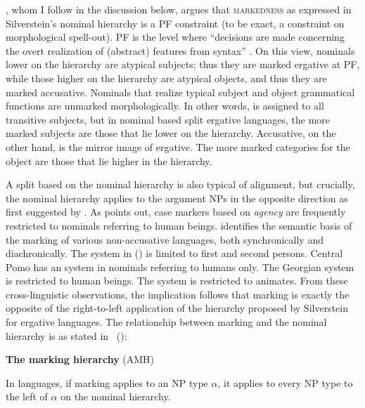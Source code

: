\documentclass[output=paper]{LSP/langsci}
\begin{document}
\citet{Woolford2008Differential}, whom I follow in the discussion below, argues that \textsc{markedness} as expressed in Silverstein’s nominal hierarchy is a PF constraint (to be exact, a constraint on morphological spell-out). PF is the level where “decisions are made concerning the overt realization of (abstract) features from syntax” \citep[29]{Woolford2008Differential}. On this view, nominals lower on the hierarchy are atypical subjects; thus they are marked ergative at PF, while those higher on the hierarchy are atypical objects, and thus they are marked accusative. Nominals that realize typical subject and object grammatical functions are unmarked morphologically. In other words,  is assigned to all transitive subjects, but in nominal based split ergative languages, the more marked subjects are those that lie lower on the hierarchy. Accusative, on the other hand, is the mirror image of ergative. The more marked categories for the object are those that lie higher in the hierarchy. 

A split based on the nominal hierarchy is also typical of  alignment, but crucially, the nominal hierarchy applies to the argument NPs in the opposite direction as first suggested by \citet{Dahlstrom1983Agent-patient}. As \citet{Mithun1991Active} points out, case markers based on \textit{agency} are frequently restricted to nominals referring to human beings. \citeauthor{Mithun1991Active} identifies the semantic basis of the  marking of various non-accusative languages, both synchronically and diachronically. The  system in  () is limited to first and second persons. Central Pomo has an  system in nominals referring to humans only. The Georgian  system is restricted to human beings. The  system is restricted to animates. From these cross-linguistic observations, the implication follows that  marking is exactly the opposite of the right-to-left application of the hierarchy proposed by Silverstein for ergative languages. The relationship between  marking and the nominal hierarchy is as stated in~ (\cf \citealt{Yanagidaetal2009Word}):

\begin{exe}
\ex%
\label{14-ya-ex:8}
\textbf{The  marking hierarchy} (AMH)

In  languages, if  marking applies to an NP type ${\alpha}$, it applies to
every NP type to the left of ${\alpha}$ on the nominal hierarchy.
\end{exe}
\end{document}
